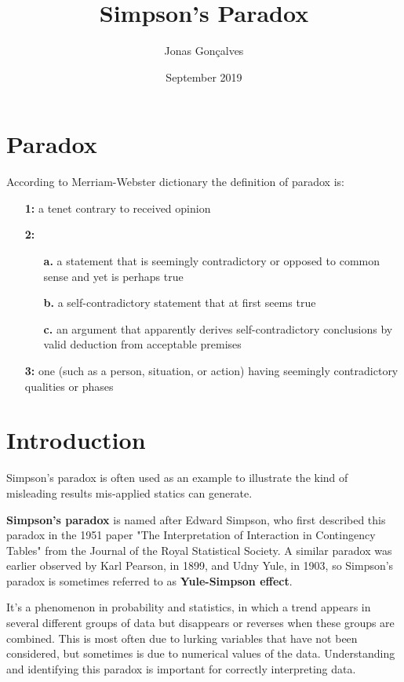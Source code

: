 \documentclass{article}
\title{Simpson's Paradox}
\author{Jonas Gonçalves}
\date{September 2019}
\begin{document}
\maketitle

\section{Paradox}
According to Merriam-Webster dictionary the definition of paradox is:
\begin{itemize}
    \item[\textbf{1:}] a tenet contrary to received opinion
    \item[\textbf{2:}]
    \begin{itemize}
        \item[\textbf{a.}] a statement that is seemingly contradictory or opposed to common sense and yet is perhaps true
        \item[\textbf{b.}] a self-contradictory statement that at first seems true
        \item[\textbf{c.}] an argument that apparently derives self-contradictory conclusions by valid deduction from acceptable premises
    \end{itemize}
    \item[\textbf{3:}] one (such as a person, situation, or action) having seemingly contradictory qualities or phases
\end{itemize}
\section{Introduction}
Simpson's paradox is often used as an example  to illustrate  the kind of misleading results mis-applied statics can generate.

\textbf{Simpson's paradox} is named after Edward Simpson, who first described this paradox in the 1951 paper  "The Interpretation of Interaction in Contingency Tables" from the Journal of the Royal Statistical Society. A similar paradox was earlier observed by Karl Pearson, in 1899, and Udny Yule, in 1903, so Simpson's paradox is sometimes referred to as \textbf{Yule-Simpson effect}.

It's a phenomenon in probability and statistics, in which a trend appears in several different groups of data but disappears or reverses when these groups are combined. This is most often due to lurking variables that have not been considered, but sometimes is due to numerical values of the data. Understanding and identifying this paradox is important for correctly interpreting data.
\end{document}

